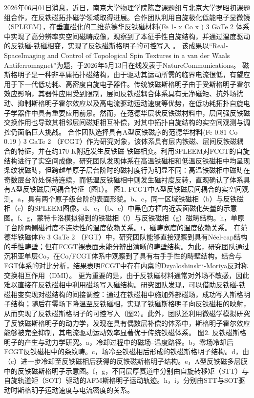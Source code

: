 \documentclass[12pt,a4paper]{ctexart}
\begin{document}
2026年06月01日消息，近日，南京大学物理学院陈宫课题组与北京大学罗昭初课题组合作，在反铁磁拓扑磁学领域取得进展。合作团队利用自旋极化低能电子显微镜（SPLEEM），在垂直磁化的二维范德华反铁磁材料(Fe
1-
x
Co
x
)
3
GaTe
2
体系中实现了高分辨率实空间磁畴成像，观察到了本征手性自旋结构，并通过温度驱动的反铁磁-铁磁相变，实现了反铁磁斯格明子的可控写入
。
该成果以“Real-SpaceImaging and Control of Topological Spin Textures in a van der Waals Antiferromagnet”为题，于2026年5月13日在线发表于NatureCommunications。
磁斯格明子是一种非平庸拓扑磁结构，由于驱动其运动所需的临界电流很低，有望应用于下一代低功耗、高密度自旋电子器件。传统铁磁斯格明子由于受斯格明子霍尔效应影响，其器件应用受到限制，层间反铁磁耦合体系具有无净磁矩、抗外场扰动、抑制斯格明子霍尔效应以及高电流驱动运动速度等优势，在低功耗拓扑自旋电子学器件中具有重要应用前景。然而，在范德华层状反铁磁材料中，层间强反铁磁交换作用也导致其相邻层间磁矩相互补偿，对其中拓扑自旋结构的实空间观测与调控仍面临巨大挑战。
合作团队选择具有A型反铁磁序的范德华材料(Fe
0.81
Co
0.19
)
3
GaTe
2
（FCGT）作为研究对象，该体系具有层内铁磁、层间反铁磁耦合的特征，并在约170 K附近发生反铁磁-铁磁相变。利用SPLEEM对FCGT的自旋结构进行了实空间成像，研究团队发现体系在高温铁磁相和低温反铁磁相中均呈现条纹状磁畴，但跨越单原子层台阶时的磁衬度行为明显不同：高温铁磁相中磁畴在奇数层台阶处保持连续，而低温反铁磁相中则发生磁衬度反转，直观确认了体系具有A型反铁磁层间耦合特征（图1）。
图1. FCGT中A型反铁磁层间耦合的实空间观测。a，具有两个原子级台阶的表面形貌。b、c，同一区域铁磁相（b）与反铁磁相（c）的SPLEEM图像。d、e，（b、c）中黑色方框内近表面磁化矢量的示意图。f、g，蒙特卡洛模拟得到的铁磁相（f）与反铁磁相（g）磁畴结构。h，单原子台阶两侧磁衬度不连续性的温度依赖关系。i，磁畴宽度的温度依赖关系。
在范德华铁磁体Fe
3
GaTe
2
（FGT）中，研究团队能够直接观察到具有Néel-cap结构的手性畴壁；但在FCGT裸表面未能分辨出清晰的畴壁结构。为此，研究团队通过沉积亚单层Co，在Co/FCGT体系中观察到了具有右手手性的畴壁结构。结合与FGT体系的对比分析，结果表明FCGT中存在内禀的Dzyaloshinskii-Moriya反对称交换相互作用（DMI）。
更为重要的是，由于反铁磁材料通常对外场不敏感，因此难以直接在反铁磁相中利用磁场写入磁结构。研究团队发现，可以借助反铁磁-铁磁相变实现对磁结构的间接调控：通过在铁磁相中施加外部磁场，成功写入斯格明子结构；随后在零场下降温至反铁磁相，实现了铁磁斯格明子向反铁磁相的映射，从而实现了反铁磁斯格明子的可控写入（图2）。此外，团队还利用微磁学模拟研究了反铁磁斯格明子的动力学，发现在具有偶数层补偿的体系中，斯格明子霍尔效应能够被完全抑制，其电流驱动运动效率显著优于传统铁磁体系。
图2. 反铁磁斯格明子的产生与动力学研究。a，冷却过程中的磁场–温度路径。b，零场冷却后FCGT反铁磁相中的条纹畴。c，场冷至铁磁相后形成的铁磁斯格明子结构。d，由（c）进一步冷却至反铁磁相后获得的反铁磁斯格明子结构。e，A型反铁磁多层膜中的反铁磁斯格明子示意图。f，g，不同层厚赛道中分别由自旋转移矩（STT）与自旋轨道矩（SOT）驱动的AFM斯格明子运动轨迹。h，i，分别由STT与SOT驱动时斯格明子运动速度与电流密度的关系。
\end{document}
